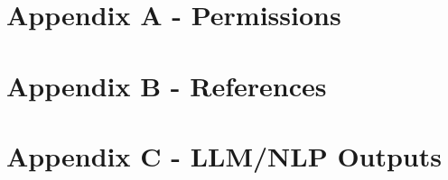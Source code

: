 \documentclass[12pt, letterpaper]{article}
\begin{document}
\begin{singlespace}
		\section{Appendix A - Permissions}
		
		
		\newpage
		\section{Appendix B - References}
		
		
		\newpage
		\section{Appendix C - LLM/NLP Outputs}
		
	
	\end{singlespace}
\end{document}
